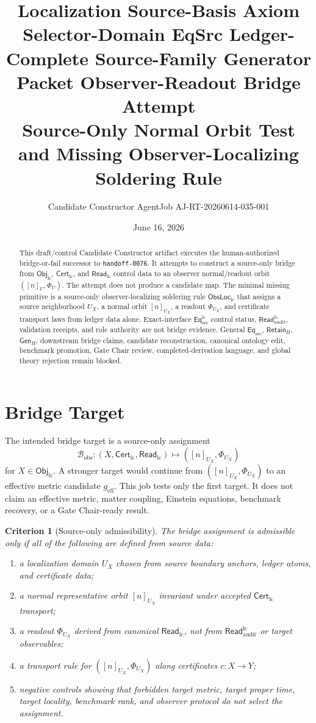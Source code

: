 \documentclass[11pt]{article}
\title{\textbf{Localization Source-Basis Axiom Selector-Domain EqSrc Ledger-Complete Source-Family Generator Packet Observer-Readout Bridge Attempt}\\[0.35em]
\large Source-Only Normal Orbit Test and Missing Observer-Localizing Soldering Rule}
\author{Candidate Constructor AgentJob AJ-RT-20260614-035-001}
\date{June 16, 2026}
\newcommand{\EqSrc}{\mathsf{Eq}_{\mathrm{src}}}
\newcommand{\EqLC}{\mathsf{Eq}_{\mathrm{src}}^{\mathrm{lc}}}
\newcommand{\ObjLC}{\mathsf{Obj}_{\mathrm{lc}}}
\newcommand{\CertLC}{\mathsf{Cert}_{\mathrm{lc}}}
\newcommand{\ReadLC}{\mathsf{Read}_{\mathrm{lc}}}
\newcommand{\ReadAudit}{\mathsf{Read}_{\mathrm{audit}}^{\mathrm{lc}}}
\newcommand{\ObsLocLC}{\mathsf{ObsLoc}_{\mathrm{lc}}}
\newcommand{\RetainH}{\mathsf{Retain}_{H}}
\newcommand{\GenH}{\mathsf{Gen}_{H}}
\newcommand{\PhiU}{\Phi_{U}}
\newcommand{\geff}{g_{\mathrm{eff}}}
\newtheorem{criterion}{Criterion}
\begin{document}
\maketitle

\begin{abstract}
This draft/control Candidate Constructor artifact executes the
human-authorized bridge-or-fail successor to \texttt{handoff-0076}.
It attempts to construct a source-only bridge from \(\ObjLC\),
\(\CertLC\), and \(\ReadLC\) control data to an observer normal/readout
orbit \(([n]_{U},\PhiU)\). The attempt does not produce a candidate
map. The minimal missing primitive is a source-only
observer-localizing soldering rule \(\ObsLocLC\) that assigns a
source neighborhood \(U_X\), a normal orbit \([n]_{U_X}\), a readout
\(\Phi_{U_X}\), and certificate transport laws from ledger data alone.
Exact-interface \(\EqLC\) control status, \(\ReadAudit\), validation
receipts, and role authority are not bridge evidence. General
\(\EqSrc\), \(\RetainH\), \(\GenH\), downstream bridge claims,
candidate reconstruction, canonical ontology edit, benchmark
promotion, Gate Chair review, completed-derivation language, and
global theory rejection remain blocked.
\end{abstract}

\section{Bridge Target}

The intended bridge target is a source-only assignment
\[
    \mathcal{B}_{\mathrm{obs}}:
    (X,\CertLC,\ReadLC)
    \longmapsto
    ([n]_{U_X},\Phi_{U_X})
\]
for \(X\in\ObjLC\). A stronger target would continue from
\(([n]_{U_X},\Phi_{U_X})\) to an effective metric candidate \(\geff\).
This job tests only the first target. It does not claim an effective
metric, matter coupling, Einstein equations, benchmark recovery, or a
Gate Chair-ready result.

\begin{criterion}[Source-only admissibility]
The bridge assignment is admissible only if all of the following are
defined from source data:
\begin{enumerate}
    \item a localization domain \(U_X\) chosen from source boundary
    anchors, ledger atoms, and certificate data;
    \item a normal representative orbit \([n]_{U_X}\) invariant under
    accepted \(\CertLC\) transport;
    \item a readout \(\Phi_{U_X}\) derived from canonical \(\ReadLC\),
    not from \(\ReadAudit\) or target observables;
    \item a transport rule for \(([n]_{U_X},\Phi_{U_X})\) along
    certificates \(c:X\to Y\);
    \item negative controls showing that forbidden target metric,
    target proper time, target locality, benchmark rank, and observer
    protocol do not select the assignment.
\end{enumerate}
\end{criterion}
\end{document}
